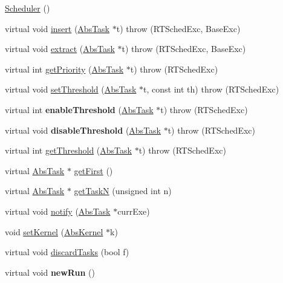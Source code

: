 \begin{DoxyCompactItemize}
\item 
\hyperlink{classRTSim_1_1Scheduler_a44381f6a65b3b4aeb8f3e609eb89b43e}{Scheduler} ()
\item 
virtual void \hyperlink{classRTSim_1_1Scheduler_a1c255aaaf5e14d62cf4aa6c5a958acd4}{insert} (\hyperlink{classRTSim_1_1AbsTask}{Abs\+Task} $\ast$t)  throw (\+R\+T\+Sched\+Exc, Base\+Exc)
\item 
virtual void \hyperlink{classRTSim_1_1Scheduler_a5c60f483575acfd839bc32893167a2af}{extract} (\hyperlink{classRTSim_1_1AbsTask}{Abs\+Task} $\ast$t)  throw (\+R\+T\+Sched\+Exc, Base\+Exc)
\item 
virtual int \hyperlink{classRTSim_1_1Scheduler_ab04d563bb4d275f11dc4b8a139a5f7b2}{get\+Priority} (\hyperlink{classRTSim_1_1AbsTask}{Abs\+Task} $\ast$t)  throw (\+R\+T\+Sched\+Exc)
\item 
virtual void \hyperlink{classRTSim_1_1Scheduler_aea8e5346791433e9ecdc2ce4276369ed}{set\+Threshold} (\hyperlink{classRTSim_1_1AbsTask}{Abs\+Task} $\ast$t, const int th)  throw (\+R\+T\+Sched\+Exc)
\item 
virtual int {\bfseries enable\+Threshold} (\hyperlink{classRTSim_1_1AbsTask}{Abs\+Task} $\ast$t)  throw (\+R\+T\+Sched\+Exc)\hypertarget{classRTSim_1_1Scheduler_ad1aa31bcd10e10c08c4bab17753489cf}{}\label{classRTSim_1_1Scheduler_ad1aa31bcd10e10c08c4bab17753489cf}

\item 
virtual void {\bfseries disable\+Threshold} (\hyperlink{classRTSim_1_1AbsTask}{Abs\+Task} $\ast$t)  throw (\+R\+T\+Sched\+Exc)\hypertarget{classRTSim_1_1Scheduler_ae3a1b8acbaeacd4395a8b781c7e21c71}{}\label{classRTSim_1_1Scheduler_ae3a1b8acbaeacd4395a8b781c7e21c71}

\item 
virtual int \hyperlink{classRTSim_1_1Scheduler_a8d456350d39d16e6a1203ac48b5be166}{get\+Threshold} (\hyperlink{classRTSim_1_1AbsTask}{Abs\+Task} $\ast$t)  throw (\+R\+T\+Sched\+Exc)
\item 
virtual \hyperlink{classRTSim_1_1AbsTask}{Abs\+Task} $\ast$ \hyperlink{classRTSim_1_1Scheduler_a0061dec59dd76a4dba2c81be933e6153}{get\+First} ()
\item 
virtual \hyperlink{classRTSim_1_1AbsTask}{Abs\+Task} $\ast$ \hyperlink{classRTSim_1_1Scheduler_a5bafdffc5d936feee71a5693d08eaa95}{get\+TaskN} (unsigned int n)
\item 
virtual void \hyperlink{classRTSim_1_1Scheduler_a6cc1f2af6181b184cf37254b44f3d068}{notify} (\hyperlink{classRTSim_1_1AbsTask}{Abs\+Task} $\ast$curr\+Exe)
\item 
void \hyperlink{classRTSim_1_1Scheduler_ae53f096ef41fb8370afebef4e0e00d02}{set\+Kernel} (\hyperlink{classRTSim_1_1AbsKernel}{Abs\+Kernel} $\ast$k)
\item 
virtual void \hyperlink{classRTSim_1_1Scheduler_aa6e0eec8ac0173f44688ed2c9b9671e7}{discard\+Tasks} (bool f)
\item 
virtual void {\bfseries new\+Run} ()\hypertarget{classRTSim_1_1Scheduler_a30044d4b9a027380df5c845552730bb8}{}\label{classRTSim_1_1Scheduler_a30044d4b9a027380df5c845552730bb8}


\end{DoxyCompactItemize}
